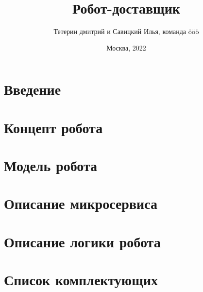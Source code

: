 \documentclass[12pt]{article}
\title{Робот-доставщик}
\author{Тетерин дмитрий и Савицкий Илья, команда ööö}
\date{Москва, 2022}
\begin{document}
\maketitle

\newpage
\tableofcontents
\newpage
\section{Введение}

\section{Концепт робота}

\section{Модель робота}

\section{Описание микросервиса}
% 
\section{Описание логики робота}

\appendix
\section{Список комплектующих}
\end{document}
